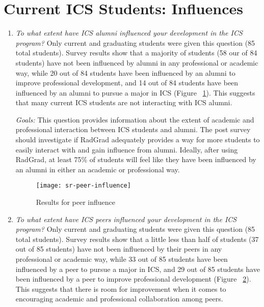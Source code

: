 \section{Current ICS Students: Influences}
\begin{enumerate}
\begin{figure}[h]
\centering
\texttt{[image: sr-alumni-influence]}
\caption{Results for alumni influence}
\label{alumni-influence}
\end{figure}
\item \textit{To what extent have ICS alumni influenced your development in the ICS program?}
Only current and graduating students were given this question (85 total students). Survey results show that a majority of students (58 our of 84 students) have not been influenced by alumni in any professional or academic way, while 20 out of 84 students have been influenced by an alumni to improve professional development, and 14 out of 84 students have been influenced by an alumni to pursue a major in ICS (Figure ~\ref{alumni-influence}). This suggests that many current ICS students are not interacting with ICS alumni.

\textit{Goals:} This question provides information about the extent of academic and professional interaction between ICS students and alumni. The post survey should investigate if RadGrad adequately provides a way for more students to easily interact with and gain influence from alumni.  Ideally, after using RadGrad, at least 75\% of students will feel like they have been influenced by an alumni in either an academic or professional way. 
   
\begin{figure}[h]
\centering
\texttt{[image: sr-peer-influence]}
\caption{Results for peer influence}
\label{peer-influence}
\end{figure}
\item \textit{To what extent have ICS peers influenced your development in the ICS program?}
Only current and graduating students were given this question (85 total students). Survey results show that a little less than half of students (37 out of 85 students) have not been influenced by their peers in any professional or academic way, while 33 out of 85 students have been influenced by a peer to pursue a major in ICS, and 29 out of 85 students have been influenced by a peer to improve professional development (Figure ~\ref{peer-influence}). This suggests that there is room for improvement when it comes to encouraging academic and professional collaboration among peers. 


\end{enumerate}
